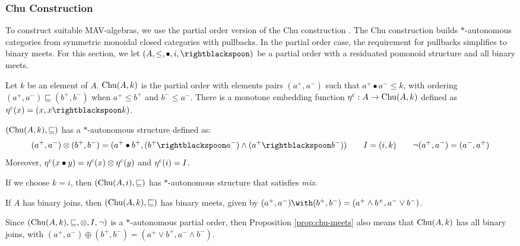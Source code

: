 \subsubsection{Chu Construction}
\label{sec:chu}

To construct suitable MAV-algebras, we use the partial order version
of the Chu construction \cite{barr}. The Chu construction builds
$*$-autonomous categories from symmetric monoidal closed categories
with pullbacks. In the partial order case, the requirement for
pullbacks simplifies to binary meets. For this section, we let
$(A, \leq, \bullet, i, \rightblackspoon)$ be a partial order with a
residuated pomonoid structure and all binary meets.

\begin{definition}\label{defn:chu}
  Let $k$ be an element of $A$. $\mathrm{Chu}(A, k)$ is the partial order with
  elements pairs $(a^+, a^-)$ such that $a^+ \bullet a^- \leq k$, with
  ordering $(a^+,a^-) \sqsubseteq (b^+, b^-)$ when $a^+ \leq b^+$ and
  $b^- \leq a^-$. There is a monotone embedding function
  $\eta^c : A \to \mathrm{Chu}(A, k)$ defined as
  $\ChuEmbed(x) = (x, x \rightblackspoon k)$.
\end{definition}

\begin{proposition}
  $(\mathrm{Chu}(A, k), \sqsubseteq)$ has a $*$-autonomous structure defined
  as:
  \begin{displaymath}
    (a^+, a^-) \otimes (b^+, b^-) = (a^+ \bullet b^+, (b^+ \rightblackspoon a^-) \land (a^+ \rightblackspoon b^-))
    \qquad
    I = (i, k)
    \qquad
    \lnot(a^+,a^-) = (a^-, a^+)
  \end{displaymath}
  Moreover,
  $\eta^c(x \bullet y) = \eta^c(x) \otimes \eta^c(y)$ and
  $\eta^c(i) = I$.
\end{proposition}

\begin{remark}
  If we choose $k = i$, then $(\mathrm{Chu}(A, i), \sqsubseteq)$ has
  $*$-autonomous structure that satisfies \emph{mix}.
\end{remark}

\begin{proposition}\label{prop:chu-meets}
  If $A$ has binary joins, then $(\mathrm{Chu}(A, k), \sqsubseteq)$ has
  binary meets, given by
  $(a^+,a^-) \with (b^+,b^-) = (a^+ \land b^+, a^- \lor b^-)$.
\end{proposition}

\begin{remark}
  Since $(\mathrm{Chu}(A, k), \sqsubseteq, \otimes, I, \lnot)$ is a
  $*$-autonomous partial order, then Proposition \ref{prop:chu-meets}
  also means that $\mathrm{Chu}(A, k)$ has all binary joins, with
  $(a^+, a^-) \oplus (b^+, b^-) = (a^+ \lor b^+, a^- \land b^-)$.
\end{remark}

